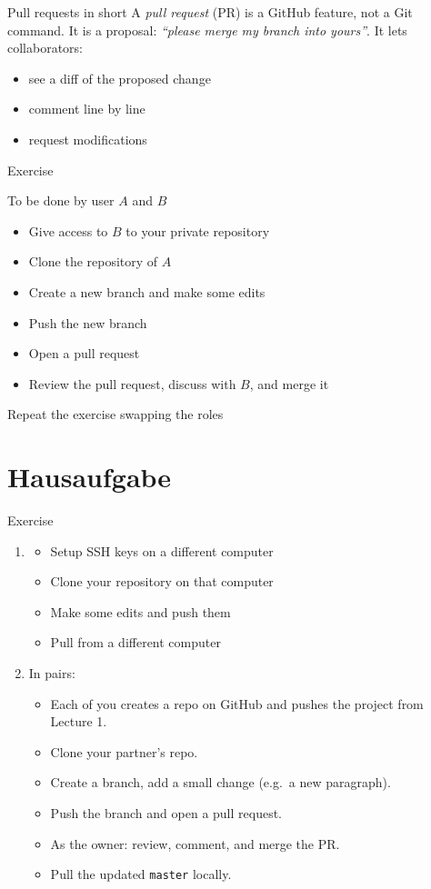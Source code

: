 \documentclass[11pt]{beamer}
\newcommand{\exercise}[1]{
  \begin{frame}{Exercise}
    #1
  \end{frame}
}
\begin{document}
\begin{frame}{Pull requests in short}
  A \emph{pull request} (PR) is a GitHub feature, not a Git command.
  \vfill
  It is a proposal: \emph{``please merge my branch into yours''}.
  \vfill
  It lets collaborators:
  \begin{itemize}
    \item see a diff of the proposed change
    \item comment line by line
    \item request modifications
  \end{itemize}
\end{frame}

\exercise{
  To be done by user $A$ and $B$
  \begin{itemize}
  \item[$A$] Give access to $B$ to your private repository
  \item[$B$] Clone the repository of $A$ 
  \item[$B$] Create a new branch and make some edits
  \item[$B$] Push the new branch
  \item[$B$] Open a pull request
  \item[$A$] Review the pull request, discuss with $B$, and merge it
  \end{itemize}

  Repeat the exercise swapping the roles
}

\section{Hausaufgabe}

\begin{frame}{Exercise}
  \begin{enumerate}
    \item
    \begin{itemize}
    \item Setup SSH keys on a different computer
    \item Clone your repository on that computer
    \item Make some edits and push them
    \item Pull from a different computer
    \end{itemize}
  \item In pairs:
    \begin{itemize}
    \item Each of you creates a repo on GitHub and pushes the project
      from Lecture 1.
    \item Clone your partner's repo.
    \item Create a branch, add a small change (e.g.\ a new paragraph).
    \item Push the branch and open a pull request.
    \item As the owner: review, comment, and merge the {PR}.
    \item Pull the updated \texttt{master} locally.
    \end{itemize}
  \end{enumerate}
\end{frame}
\end{document}
